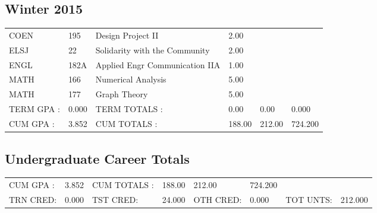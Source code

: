 \documentclass{scrartcl}\usepackage[T1]{fontenc}
\begin{document}
\subsection{Winter 2015}
\begin{tabu}{ l  l  l  l  l  l }
COEN&195&Design Project II&2.00&&\\
ELSJ&22&Solidarity with the Community&2.00&&\\
ENGL&182A&Applied Engr Communication IIA&1.00&&\\
MATH&166&Numerical Analysis&5.00&&\\
MATH&177&Graph Theory&5.00&&\\
\hline
TERM GPA :&0.000&TERM TOTALS :&0.00&0.00&0.000\\
CUM GPA :&3.852&CUM TOTALS :&188.00&212.00&724.200\\\end{tabu}
\subsection{Undergraduate Career Totals}
\begin{tabu}{ l  l  l  l  l  l  l  l }
CUM GPA :&3.852&CUM TOTALS :&188.00&212.00&724.200&&\\
TRN CRED:&0.000&TST CRED:&24.000&OTH CRED:&0.000&TOT UNTS:&212.000\\\end{tabu}
\end{document}
